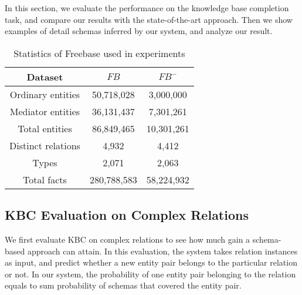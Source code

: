 
In this section, we evaluate the performance on the knowledge base
completion task, and compare our results with the state-of-the-art approach.
Then we show examples of detail schemas inferred by our system, and
analyze our result.
\begin{table}[ht]
	\small
	\centering
	\caption{Statistics of Freebase used in experiments}
	\begin{tabular}{|c|c|c|}
		\hline
		Dataset				& $FB$			& $FB^-$ 	\\
        \hline
		Ordinary entities	& 50,718,028	& 3,000,000		\\
        \hline
        Mediator entities	& 36,131,437	& 7,301,261		\\
		\hline
		Total entities		& 86,849,465	& 10,301,261	 \\
		\hline
		Distinct relations	& 4,932			& 4,412			\\
        \hline
		Types 				& 2,071			& 2,063			\\
		\hline
		Total facts			& 280,788,583	& 58,224,932	\\
		\hline
	\end{tabular}%
	\label{tab:fb-size}%
\end{table}

\subsection{KBC Evaluation on Complex Relations}
We first evaluate KBC on complex relations to see how much gain a schema-based approach can attain.
In this evaluation, the system takes relation instances as input,
and predict whether a new entity pair belongs to the particular relation or not.
In our system, the probability of one entity pair belonging to the relation
equals to sum probability of schemas that covered the entity pair.

